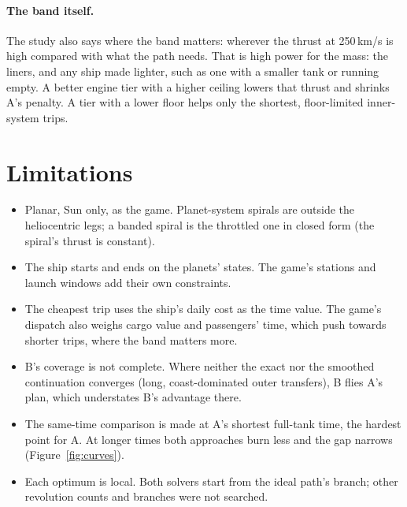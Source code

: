 \documentclass[10pt,a4paper]{article}
\begin{document}
\paragraph{The band itself.} The study also says where the band matters: wherever the thrust at 250\,km/s is high
compared with what the path needs. That is high power for the mass: the liners, and any ship made lighter, such
as one with a smaller tank or running empty. A better engine tier with a higher ceiling lowers that thrust and
shrinks A's penalty. A tier with a lower floor helps only the shortest, floor-limited inner-system trips.


\section{Limitations}
\begin{itemize}
\item Planar, Sun only, as the game. Planet-system spirals are outside the heliocentric legs; a banded spiral is
  the throttled one in closed form (the spiral's thrust is constant).
\item The ship starts and ends on the planets' states. The game's stations and launch windows add their own
  constraints.
\item The cheapest trip uses the ship's daily cost as the time value. The game's dispatch also weighs cargo value
  and passengers' time, which push towards shorter trips, where the band matters more.
\item B's coverage is not complete. Where neither the exact nor the smoothed continuation converges (long,
  coast-dominated outer transfers), B flies A's plan, which understates B's advantage there.
\item The same-time comparison is made at A's shortest full-tank time, the hardest point for A. At longer times
  both approaches burn less and the gap narrows (Figure~\ref{fig:curves}).
\item Each optimum is local. Both solvers start from the ideal path's branch; other revolution counts and branches
  were not searched.
\end{itemize}
\end{document}
